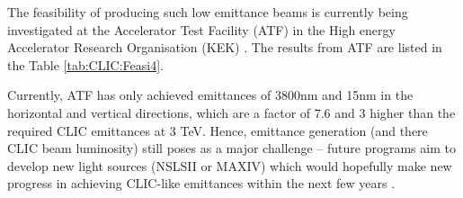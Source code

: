 \begin{table}[!htb]
\caption{Required parameters of the beam before injection and at extraction from the damping rings (emittance parameters). \cite{CLIC:Concept}}
\label{tab:CLIC:Feasi3}
\end{table}

The feasibility of producing such low emittance beams is currently being investigated at the Accelerator Test Facility (ATF) \cite{KEK:ATF} in the High energy Accelerator Research Organisation (KEK) \cite{KEK}. The results from ATF are listed in the Table \ref{tab:CLIC:Feasi4}.

Currently, ATF has only achieved emittances of 3800nm and 15nm in the horizontal and vertical directions, which are a factor of 7.6 and 3 higher than the required CLIC emittances at 3 TeV. Hence, emittance generation (and there CLIC beam luminosity) still poses as a major challenge – future programs aim to develop new light sources (NSLSII or MAXIV) which would hopefully make new progress in achieving CLIC-like emittances within the next few years \cite{CLIC:Concept}.

